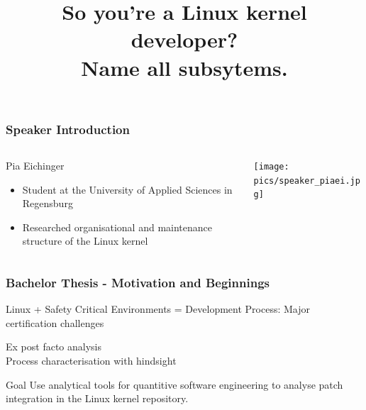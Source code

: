 \documentclass{beamer}
\title{So you're a Linux kernel developer? \\Name all subsytems.}
\begin{document}





	\begin{frame}
	\frametitle{Speaker Introduction}
	\begin{columns}
		\begin{column}{0.55\textwidth}
			\begin{block}{Pia Eichinger}
			\begin{itemize}
			\item Student at the University of Applied Sciences in Regensburg
			\item Researched organisational and maintenance structure of the Linux kernel
			\end{itemize}
			\end{block}
		\end{column}
		\begin{column}{0.4\textwidth}
     		\texttt{[image: pics/speaker\_piaei.jpg]}
		\end{column}
	\end{columns}
	\end{frame}

	\begin{frame}
	\frametitle{Bachelor Thesis - Motivation and Beginnings}
		\begin{block}{Linux + Safety Critical Environments}
			= Development Process: Major certification challenges
		\end{block}
		\Rightarrow Ex post facto analysis\\ %
		\Rightarrow Process characterisation with hindsight

		\begin{alertblock}{Goal}
			Use analytical tools for quantitive software engineering to analyse patch integration in the Linux kernel repository. %
		\end{alertblock}
	\end{frame}
\end{document}
